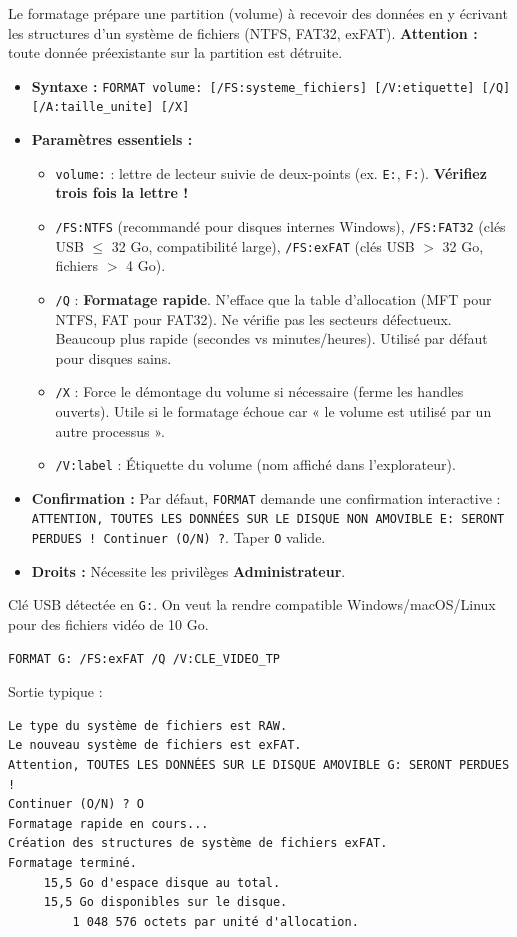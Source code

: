 \documentclass[11pt]{article}
\begin{document}
\begin{propriete}
Le formatage prépare une partition (volume) à recevoir des données en y écrivant les structures d'un système de fichiers (NTFS, FAT32, exFAT). \textbf{Attention :} toute donnée préexistante sur la partition est détruite.
\begin{itemize}
    \item \textbf{Syntaxe :} \texttt{FORMAT volume: [/FS:systeme\_fichiers] [/V:etiquette] [/Q] [/A:taille\_unite] [/X]}
    \item \textbf{Paramètres essentiels :}
    \begin{itemize}
        \item \texttt{volume:} : lettre de lecteur suivie de deux-points (ex. \texttt{E:}, \texttt{F:}). \textbf{Vérifiez trois fois la lettre !}
        \item \texttt{/FS:NTFS} (recommandé pour disques internes Windows), \texttt{/FS:FAT32} (clés USB $\le$ 32 Go, compatibilité large), \texttt{/FS:exFAT} (clés USB $>$ 32 Go, fichiers $>$ 4 Go).
        \item \texttt{/Q} : \textbf{Formatage rapide}. N'efface que la table d'allocation (MFT pour NTFS, FAT pour FAT32). Ne vérifie pas les secteurs défectueux. Beaucoup plus rapide (secondes vs minutes/heures). Utilisé par défaut pour disques sains.
        \item \texttt{/X} : Force le démontage du volume si nécessaire (ferme les handles ouverts). Utile si le formatage échoue car « le volume est utilisé par un autre processus ».
        \item \texttt{/V:label} : Étiquette du volume (nom affiché dans l'explorateur).
    \end{itemize}
    \item \textbf{Confirmation :} Par défaut, \texttt{FORMAT} demande une confirmation interactive : \texttt{ATTENTION, TOUTES LES DONNÉES SUR LE DISQUE NON AMOVIBLE E: SERONT PERDUES ! Continuer (O/N) ?}. Taper \texttt{O} valide.
    \item \textbf{Droits :} Nécessite les privilèges \textbf{Administrateur}.
\end{itemize}
\end{propriete}

\begin{exemplebox}
Clé USB détectée en \texttt{G:}. On veut la rendre compatible Windows/macOS/Linux pour des fichiers vidéo de 10 Go.
\begin{lstlisting}
FORMAT G: /FS:exFAT /Q /V:CLE_VIDEO_TP
\end{lstlisting}
Sortie typique :
\begin{lstlisting}
Le type du système de fichiers est RAW.
Le nouveau système de fichiers est exFAT.
Attention, TOUTES LES DONNÉES SUR LE DISQUE AMOVIBLE G: SERONT PERDUES !
Continuer (O/N) ? O
Formatage rapide en cours...
Création des structures de système de fichiers exFAT.
Formatage terminé.
     15,5 Go d'espace disque au total.
     15,5 Go disponibles sur le disque.
         1 048 576 octets par unité d'allocation.
\end{lstlisting}
\end{exemplebox}
\end{document}
